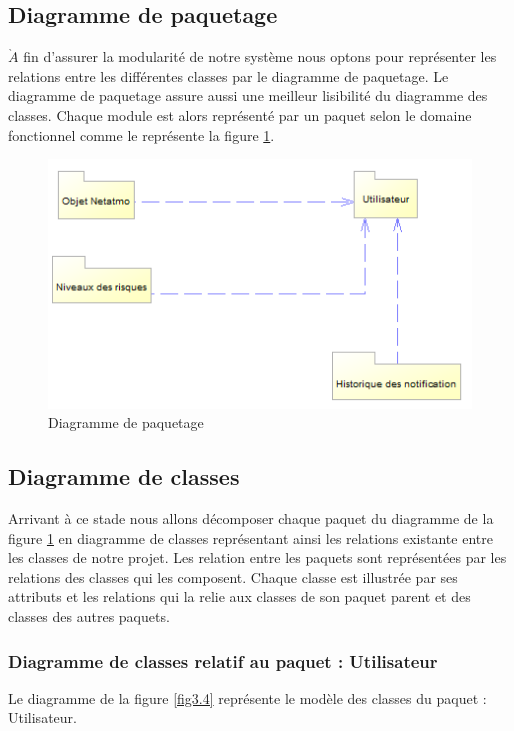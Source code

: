 \subsection{Diagramme de paquetage}
\qquad $\grave{A}$ fin d'assurer la modularité de notre système nous optons pour représenter les relations entre les différentes classes par le diagramme de paquetage. Le diagramme de paquetage assure aussi une meilleur lisibilité du diagramme des classes. Chaque module est alors représenté par un paquet selon le domaine fonctionnel comme le représente la figure \ref{fig3.3}.

\begin{figure}[!h]
	\begin{center}
		\includegraphics[width=0.64\textheight]{figures/pckg1}
	\end{center}
	\caption{Diagramme de paquetage}
	\label{fig3.3}
\end{figure}
\newpage
\subsection{Diagramme de classes}

\qquad Arrivant à ce stade nous allons décomposer chaque paquet du diagramme de la figure \ref{fig3.3} en diagramme de classes représentant ainsi les relations existante entre les classes de notre projet. Les relation entre les paquets sont représentées par les relations des classes qui les composent. Chaque classe est illustrée par ses attributs et les relations qui la relie aux classes de son paquet parent et des classes des autres paquets.

\subsubsection{Diagramme de classes relatif au paquet : Utilisateur}

\qquad Le diagramme de la figure \ref{fig3.4} représente le modèle des classes du paquet : Utilisateur.

